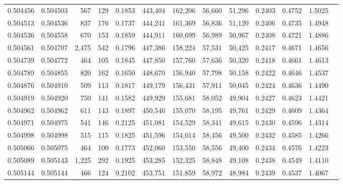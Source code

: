 \begin{tabular}{rrrrrrrrrrrrr}
0.504456 & 0.504503 &   567 &   129 &                                     0.1853 & 443,404 & 162,206 &  56,660 &  51,296 & 0.2403 & 0.4752 & 1.5025 \\
0.504513 & 0.504536 &   837 &   176 &                                     0.1737 & 444,241 & 161,369 &  56,836 &  51,120 & 0.2406 & 0.4735 & 1.4948 \\
0.504536 & 0.504558 &   670 &   153 &                                     0.1859 & 444,911 & 160,699 &  56,989 &  50,967 & 0.2408 & 0.4721 & 1.4886 \\
0.504561 & 0.504707 & 2,475 &   542 &                                     0.1796 & 447,386 & 158,224 &  57,531 &  50,425 & 0.2417 & 0.4671 & 1.4656 \\
0.504739 & 0.504772 &   464 &   105 &                                     0.1845 & 447,850 & 157,760 &  57,636 &  50,320 & 0.2418 & 0.4661 & 1.4613 \\
0.504789 & 0.504855 &   820 &   162 &                                     0.1650 & 448,670 & 156,940 &  57,798 &  50,158 & 0.2422 & 0.4646 & 1.4537 \\
0.504876 & 0.504910 &   509 &   113 &                                     0.1817 & 449,179 & 156,431 &  57,911 &  50,045 & 0.2424 & 0.4636 & 1.4490 \\
0.504919 & 0.504920 &   750 &   141 &                                     0.1582 & 449,929 & 155,681 &  58,052 &  49,904 & 0.2427 & 0.4623 & 1.4421 \\
0.504962 & 0.504962 &   611 &   143 &                                     0.1897 & 450,540 & 155,070 &  58,195 &  49,761 & 0.2429 & 0.4609 & 1.4364 \\
0.504971 & 0.504975 &   541 &   146 &                                     0.2125 & 451,081 & 154,529 &  58,341 &  49,615 & 0.2430 & 0.4596 & 1.4314 \\
0.504998 & 0.504998 &   515 &   115 &                                     0.1825 & 451,596 & 154,014 &  58,456 &  49,500 & 0.2432 & 0.4585 & 1.4266 \\
0.505066 & 0.505075 &   464 &   100 &                                     0.1773 & 452,060 & 153,550 &  58,556 &  49,400 & 0.2434 & 0.4576 & 1.4223 \\
0.505089 & 0.505143 & 1,225 &   292 &                                     0.1925 & 453,285 & 152,325 &  58,848 &  49,108 & 0.2438 & 0.4549 & 1.4110 \\
0.505144 & 0.505144 &   466 &   124 &                                     0.2102 & 453,751 & 151,859 &  58,972 &  48,984 & 0.2439 & 0.4537 & 1.4067 \\

\end{tabular}
